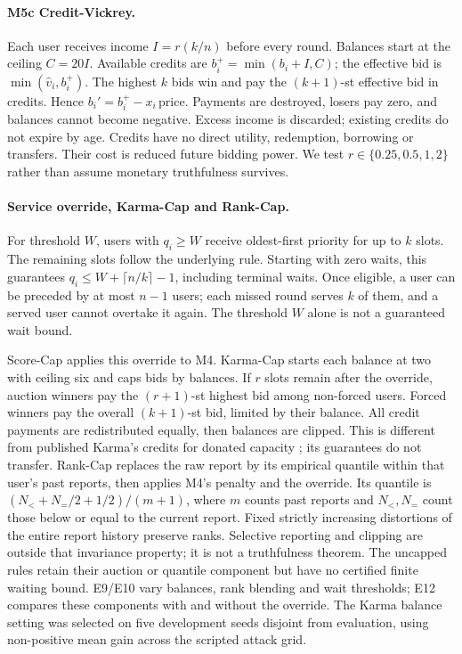 \documentclass{article}
\begin{document}
\paragraph{M5c Credit-Vickrey.}
Each user receives income $I=r(k/n)$ before every round. Balances start at
the ceiling $C=20I$. Available credits are $b_i^+=\min(b_i+I,C)$;
the effective bid is $\min(\hat v_i,b_i^+)$. The highest $k$ bids win and pay
the $(k+1)$-st effective bid in credits. Hence
$b_i'=b_i^+-x_i\,\mathrm{price}$. Payments are destroyed, losers pay zero,
and balances cannot become negative. Excess income is discarded; existing
credits do not expire by age. Credits have no direct utility, redemption,
borrowing or transfers. Their cost is reduced future bidding power.
We test $r\in\{0.25,0.5,1,2\}$ rather than assume monetary truthfulness survives.

\paragraph{Service override, Karma-Cap and Rank-Cap.}
For threshold $W$, users with $q_i\ge W$ receive oldest-first priority for
up to $k$ slots. The remaining slots follow the underlying rule.
Starting with zero waits, this guarantees $q_i\le W+\lceil n/k\rceil-1$,
including terminal waits. Once eligible, a user can be preceded by at most
$n-1$ users; each missed round serves $k$ of them, and a served user cannot
overtake it again. The threshold $W$ alone is not a guaranteed wait bound.

Score-Cap applies this override to M4. Karma-Cap starts each balance at two
with ceiling six and caps bids by balances. If $r$ slots remain after the
override, auction winners pay the $(r+1)$-st highest bid among non-forced users.
Forced winners pay the overall $(k+1)$-st bid, limited by their balance.
All credit payments are redistributed equally, then
balances are clipped. This is different from published Karma's credits for
donated capacity \cite{vuppalapati2023karma}; its guarantees do not transfer.
Rank-Cap replaces the raw report by its empirical quantile within that user's
past reports, then applies M4's penalty and the override. Its quantile is
$(N_{<}+N_{=}/2+1/2)/(m+1)$, where $m$ counts past reports and
$N_{<},N_{=}$ count those below or equal to the current report.
Fixed strictly increasing distortions of the
entire report history preserve ranks. Selective reporting and clipping are
outside that invariance property; it is not a truthfulness theorem.
The uncapped rules retain their auction or quantile component but have no
certified finite waiting bound. E9/E10 vary balances, rank blending and wait
thresholds; E12 compares these components with and without the override.
The Karma balance setting was selected on five development seeds disjoint
from evaluation, using non-positive mean gain across the scripted attack grid.
\end{document}
